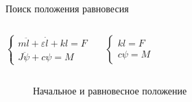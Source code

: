 \documentclass[ignoreonframetext,unicode]{beamer}
\begin{document}
\begin{frame}{Поиск положения равновесия}
	
		\begin{columns}
			\begin{block}{}
			\begin{equation*}
				\begin{cases*}
					m \ddot{l} + \varepsilon \dot{l} + k l  = F \\
					J \ddot{\psi} + c \psi = M
				\end{cases*}
				\label{lagrsdfdsfsange_fin}
			\end{equation*}
			\end{block}

			\begin{block}{}
			\begin{equation*}
				\begin{cases*}
					k l = F \\
					c \psi = M
				\end{cases*}
				\label{temp_ldsfsdfsdfagr}
			\end{equation*}
			\end{block}
		
\end{columns}



\vspace*{-1mm}
\begin{figure}[!htbp]
	\caption{Начальное и равновесное положение}
	\label{res_chasdasdaeck_func_2}
\end{figure}



\end{frame}
\end{document}
